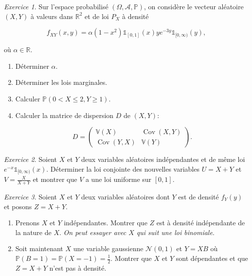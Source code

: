 \documentclass[french]{book}
\theoremstyle{definition}
\theoremstyle{remark}
\newtheorem{exo}{Exercice}
\newcommand{\lesss}{<}
\newcommand{\less}{\lesss}
\begin{document}
\begin{exo}
  Sur l'espace probabilisé \((\Omega, \mathscr{A}, \mathbb{P})\), on considère le vecteur aléatoire \((X, Y)\) à valeurs dans \(\mathbb{R}^2\) et de loi \(P_X\) à densité

  \[f _{XY}(x,y) = \alpha(1-x ^2) \mathds{1}_{[0, 1]}(x)y e^{-3y} \mathds{1}_{[0, \infty)}(y), \]

  où \(\alpha \in \mathbb{R}\).

  \begin{enumerate}
    \item Déterminer \(\alpha\).
    \item Déterminer les lois marginales.
    \item Calculer \(\mathbb{P}(0 \less X \leq 2, Y \geq 1)\).
    \item Calculer la matrice de dispersion \(D\) de \((X,Y)\):

    \[D= \left(\begin{matrix}
      \mathbb{V}(X) & \operatorname{Cov}(X,Y) \\
      \operatorname{Cov}(Y,X) & \mathbb{V}(Y)
    \end{matrix}\right).\]
  \end{enumerate}


\end{exo}

\begin{exo}
  Soient \(X\) et \(Y\) deux variables aléatoires indépendantes et de même loi \(e^{-x}\mathds{1}_{[0, \infty)}(x)\). Déterminer la loi conjointe des nouvelles variables \(U = X+Y\) et \(V = \displaystyle\frac{X}{X+Y}\) et montrer que \(V\) a une loi uniforme sur \([0,1]\).
\end{exo}

\begin{exo}
  Soient \(X\) et \(Y\) deux variables aléatoires dont \(Y\) est de densité \(f _{Y}(y)\) et posons \(Z = X+Y\).

  \begin{enumerate}
    \item Prenons \(X\) et \(Y\) indépendantes. Montrer que \(Z\) est à densité indépendante de la nature de \(X\). \emph{On peut essayer avec \(X\) qui suit une loi binomiale}.
    \item Soit maintenant \(X\) une variable gaussienne \(\mathscr{N}(0, 1)\) et \(Y=XB\) où \(\mathbb{P}(B=1) = \mathbb{P}(X=-1) = \frac{1}{2}\). Montrer que \(X\) et \(Y\) sont dépendantes et que \(Z = X+Y\) n'est pas à densité.
  \end{enumerate}
\end{exo}
\end{document}
